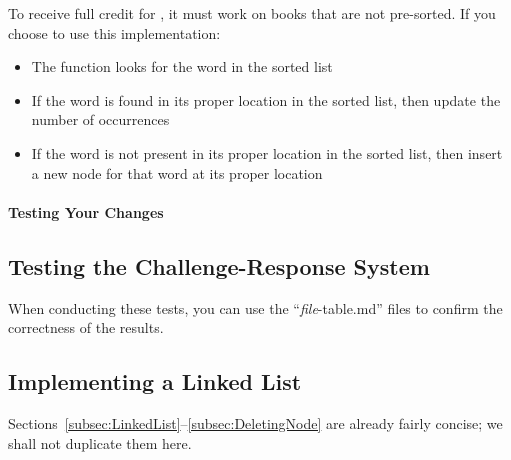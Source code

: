         To receive full credit for , it must work on books that are not pre-sorted.
        If you choose to use this implementation:
        \begin{description}
            \begin{itemize}
                \item The function looks for the word in the sorted list
                \item If the word is found in its proper location in the sorted list, then update the number of occurrences
                \item If the word is not present in its proper location in the sorted list, then insert a new node for that word at its proper location
            \end{itemize}
        \end{description}

    \paragraph{Testing Your Changes}

        \begin{description}
        \end{description}

    \subsection{Testing the Challenge-Response System} \label{subsec:tldrTestingChallengeResponse}

        When conducting these tests, you can use the ``\textit{file}-table.md'' files to confirm the correctness of the results.

        \begin{description}
        \end{description}


\subsection{Implementing a Linked List}

    Sections~\ref{subsec:LinkedList}--\ref{subsec:DeletingNode} are already fairly concise;
    we shall not duplicate them here.


